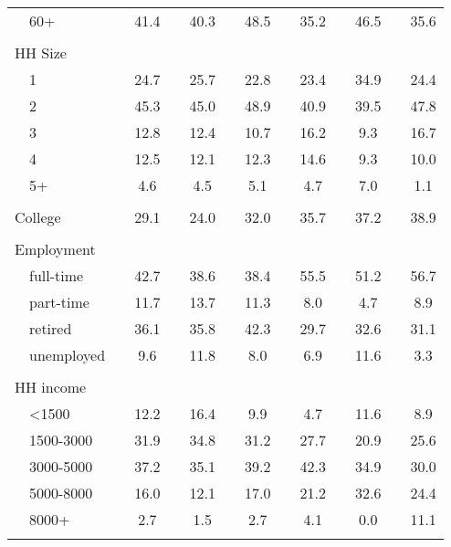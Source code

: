 \begin{table}[]
{\begin{threeparttable}
\begin{tabular}{ll|cccccccccccc}
				& 60+ &  & 41.4 &  & 40.3 &  & 48.5 &  & 35.2 &  & 46.5 &  & 35.6 \\
				&  &  &  &  &  &  &  &  &  &  &  &  &  \\
				\multicolumn{2}{l|}{HH Size} &  &  &  &  &  &  &  &  &  &  &  &  \\
				& 1 &  & 24.7 &  & 25.7 &  & 22.8 &  & 23.4 &  & 34.9 &  & 24.4 \\
				& 2 &  & 45.3 &  & 45.0 &  & 48.9 &  & 40.9 &  & 39.5 &  & 47.8 \\
				& 3 &  & 12.8 &  & 12.4 &  & 10.7 &  & 16.2 &  & 9.3 &  & 16.7 \\
				& 4 &  & 12.5 &  & 12.1 &  & 12.3 &  & 14.6 &  & 9.3 &  & 10.0 \\
				& 5+ &  & 4.6 &  & 4.5 &  & 5.1 &  & 4.7 &  & 7.0 &  & 1.1 \\
				&  &  &  &  &  &  &  &  &  &  &  &  &  \\
				\multicolumn{2}{l|}{College} &  & 29.1 &  & 24.0 &  & 32.0 &  & 35.7 &  & 37.2 &  & 38.9 \\
				&  &  &  &  &  &  &  &  &  &  &  &  &  \\
				\multicolumn{2}{l|}{Employment} &  &  &  &  &  &  &  &  &  &  &  &  \\
				& full-time &  & 42.7 &  & 38.6 &  & 38.4 &  & 55.5 &  & 51.2 &  & 56.7 \\
				& part-time &  & 11.7 &  & 13.7 &  & 11.3 &  & 8.0 &  & 4.7 &  & 8.9 \\
				& retired &  & 36.1 &  & 35.8 &  & 42.3 &  & 29.7 &  & 32.6 &  & 31.1 \\
				& unemployed &  & 9.6 &  & 11.8 &  & 8.0 &  & 6.9 &  & 11.6 &  & 3.3 \\
				&  &  &  &  &  &  &  &  &  &  &  &  &  \\
				\multicolumn{2}{l|}{HH income} &  &  &  &  &  &  &  &  &  &  &  &  \\
				& \textless{}1500 &  & 12.2 &  & 16.4 &  & 9.9 &  & 4.7 &  & 11.6 &  & 8.9 \\
				& 1500-3000 &  & 31.9 &  & 34.8 &  & 31.2 &  & 27.7 &  & 20.9 &  & 25.6 \\
				& 3000-5000 &  & 37.2 &  & 35.1 &  & 39.2 &  & 42.3 &  & 34.9 &  & 30.0 \\
				& 5000-8000 &  & 16.0 &  & 12.1 &  & 17.0 &  & 21.2 &  & 32.6 &  & 24.4 \\
				& 8000+ &  & 2.7 &  & 1.5 &  & 2.7 &  & 4.1 &  & 0.0 &  & 11.1 \\
				&  &  &  &  &  &  &  &  &  &  &  &  &  \\

\end{tabular}
\end{threeparttable}}
\end{table}
